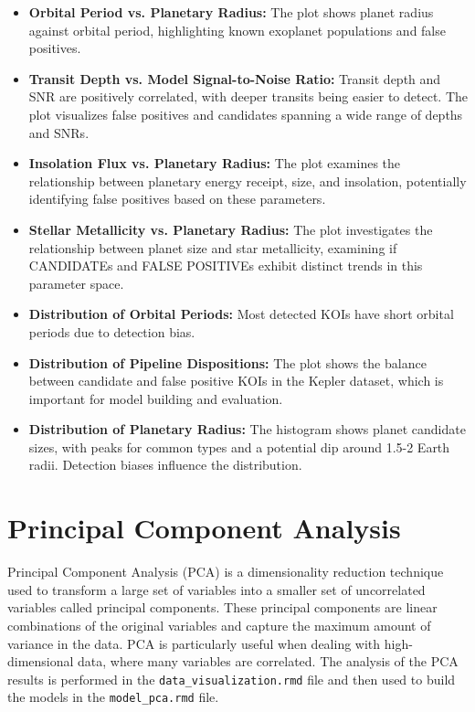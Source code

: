 \begin{itemize}
    \item \textbf{Orbital Period vs. Planetary Radius:} The plot shows planet radius against orbital period, highlighting known exoplanet populations and false positives.
    \item \textbf{Transit Depth vs. Model Signal-to-Noise Ratio:} Transit depth and SNR are positively correlated, with deeper transits being easier to detect. The plot visualizes false positives and candidates spanning a wide range of depths and SNRs.
    \item \textbf{Insolation Flux vs. Planetary Radius:} The plot examines the relationship between planetary energy receipt, size, and insolation, potentially identifying false positives based on these parameters.
    \item \textbf{Stellar Metallicity vs. Planetary Radius:} The plot investigates the relationship between planet size and star metallicity, examining if CANDIDATEs and FALSE POSITIVEs exhibit distinct trends in this parameter space.
    \item \textbf{Distribution of Orbital Periods:} Most detected KOIs have short orbital periods due to detection bias.
    \item \textbf{Distribution of Pipeline Dispositions:} The plot shows the balance between candidate and false positive KOIs in the Kepler dataset, which is important for model building and evaluation.
    \item \textbf{Distribution of Planetary Radius:} The histogram shows planet candidate sizes, with peaks for common types and a potential dip around 1.5-2 Earth radii. Detection biases influence the distribution.
\end{itemize}

\section{Principal Component Analysis}
Principal Component Analysis (PCA) is a dimensionality reduction technique used to transform a large set of variables into a smaller set of uncorrelated variables called principal components. These principal components are linear combinations of the original variables and capture the maximum amount of variance in the data. PCA is particularly useful when dealing with high-dimensional data, where many variables are correlated. The analysis of the PCA results is performed in the \texttt{data\_visualization.rmd} file and then used to build the models in the \texttt{model\_pca.rmd} file. 

